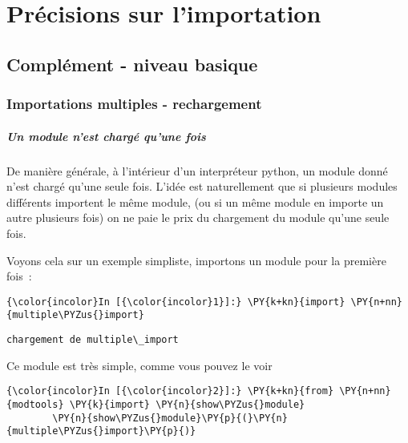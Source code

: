     
    
    
    

    

    \hypertarget{pruxe9cisions-sur-limportation}{%
\section{Précisions sur
l'importation}\label{pruxe9cisions-sur-limportation}}

    \hypertarget{compluxe9ment---niveau-basique}{%
\subsection{Complément - niveau
basique}\label{compluxe9ment---niveau-basique}}

    \hypertarget{importations-multiples---rechargement}{%
\subsubsection{Importations multiples -
rechargement}\label{importations-multiples---rechargement}}

    \hypertarget{un-module-nest-charguxe9-quune-fois}{%
\subparagraph{Un module n'est chargé qu'une
fois}\label{un-module-nest-charguxe9-quune-fois}}

    De manière générale, à l'intérieur d'un interpréteur python, un module
donné n'est chargé qu'une seule fois. L'idée est naturellement que si
plusieurs modules différents importent le même module, (ou si un même
module en importe un autre plusieurs fois) on ne paie le prix du
chargement du module qu'une seule fois.

Voyons cela sur un exemple simpliste, importons un module pour la
première fois~:

    \begin{Verbatim}[commandchars=\\\{\}]
{\color{incolor}In [{\color{incolor}1}]:} \PY{k+kn}{import} \PY{n+nn}{multiple\PYZus{}import}
\end{Verbatim}


    \begin{Verbatim}[commandchars=\\\{\}]
chargement de multiple\_import

    \end{Verbatim}

    Ce module est très simple, comme vous pouvez le voir

    \begin{Verbatim}[commandchars=\\\{\}]
{\color{incolor}In [{\color{incolor}2}]:} \PY{k+kn}{from} \PY{n+nn}{modtools} \PY{k}{import} \PY{n}{show\PYZus{}module}
        \PY{n}{show\PYZus{}module}\PY{p}{(}\PY{n}{multiple\PYZus{}import}\PY{p}{)}
\end{Verbatim}


